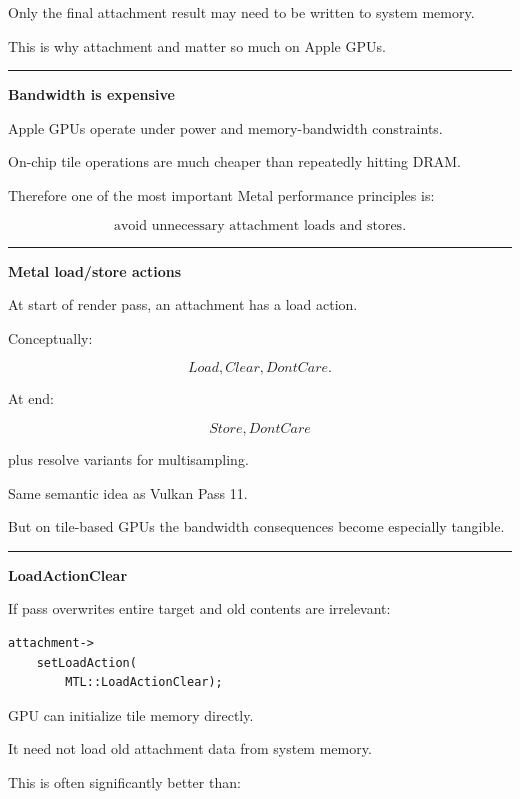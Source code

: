 Only the final attachment result may need to be written to system memory.

This is why attachment  and  matter so much on Apple GPUs.

\begin{center}\rule{0.5\linewidth}{0.5pt}\end{center}

\textbf{Bandwidth is expensive}

Apple GPUs operate under power and memory-bandwidth constraints.

On-chip tile operations are much cheaper than repeatedly hitting DRAM.

Therefore one of the most important Metal performance principles is:

\[
\boxed{
\text{avoid unnecessary attachment loads and stores}.
}
\]

\begin{center}\rule{0.5\linewidth}{0.5pt}\end{center}

\textbf{Metal load/store actions}

At start of render pass, an attachment has a load action.

Conceptually:

\[
Load,
Clear,
DontCare.
\]

At end:

\[
Store,
DontCare
\]

plus resolve variants for multisampling.

Same semantic idea as Vulkan Pass 11.

But on tile-based GPUs the bandwidth consequences become especially tangible.

\begin{center}\rule{0.5\linewidth}{0.5pt}\end{center}

\textbf{LoadActionClear}

If pass overwrites entire target and old contents are irrelevant:

\begin{verbatim}
attachment->
    setLoadAction(
        MTL::LoadActionClear);
\end{verbatim}

GPU can initialize tile memory directly.

It need not load old attachment data from system memory.

This is often significantly better than:

